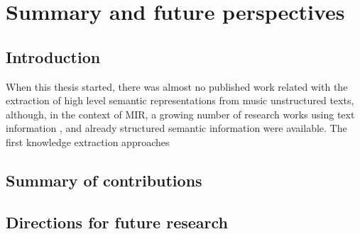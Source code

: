 
\chapter{Summary and future perspectives}
\label{sec:conclusion}

\section{Introduction}

When this thesis started, there was almost no published work related with the extraction of high level semantic representations from music unstructured texts, although, in the context of MIR, a growing number of research works using text information \cite{}, and already structured semantic information \cite{} were available. The first knowledge extraction approaches \cite{Tata2010,Knees2011,Sordo2012}

\section{Summary of contributions}
\label{sec:conclusion:summary}


\section{Directions for future research}
\label{sec:conclusion:future}

